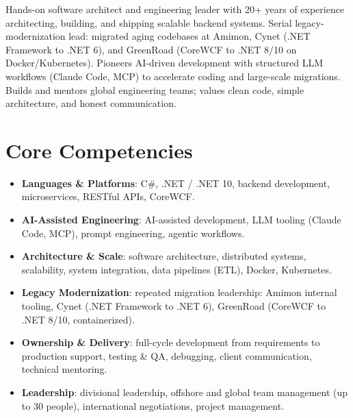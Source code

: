 \documentclass[11pt,a4paper,sans]{moderncv}
\begin{document}
\makecvtitle


\vspace{6pt}
\small{Hands-on software architect and engineering leader with 20+ years of experience architecting, building, and shipping scalable backend systems. Serial legacy-modernization lead: migrated aging codebases at Amimon, Cynet (.NET Framework to .NET 6), and GreenRoad (CoreWCF to .NET 8/10 on Docker/Kubernetes). Pioneers AI-driven development with structured LLM workflows (Claude Code, MCP) to accelerate coding and large-scale migrations. Builds and mentors global engineering teams; values clean code, simple architecture, and honest communication.}


\section{Core Competencies}
\vspace{1pt}
\begin{itemize}

\item \textbf{Languages \& Platforms}: C\#, .NET / .NET 10, backend development, microservices, RESTful APIs, CoreWCF.

\item \textbf{AI-Assisted Engineering}: AI-assisted development, LLM tooling (Claude Code, MCP), prompt engineering, agentic workflows.

\item \textbf{Architecture \& Scale}: software architecture, distributed systems, scalability, system integration, data pipelines (ETL), Docker, Kubernetes.

\item \textbf{Legacy Modernization}: repeated migration leadership: Amimon internal tooling, Cynet (.NET Framework to .NET 6), GreenRoad (CoreWCF to .NET 8/10, containerized).

\item \textbf{Ownership \& Delivery}: full-cycle development from requirements to production support, testing \& QA, debugging, client communication, technical mentoring.

\item \textbf{Leadership}: divisional leadership, offshore and global team management (up to 30 people), international negotiations, project management.

\end{itemize}
\end{document}

